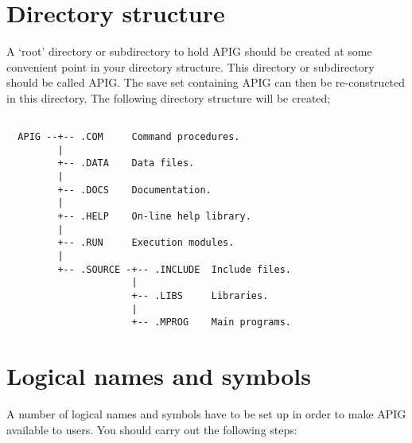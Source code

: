 \section{Directory structure}

A `root' directory or subdirectory to hold APIG should be created at 
some convenient point in your directory structure. This directory or
subdirectory should be called APIG. The save set containing APIG can 
then be re-constructed in this directory. The following directory
structure will be created;

\nopagebreak
\begin{verbatim}

  APIG --+-- .COM     Command procedures.
         |
         +-- .DATA    Data files.
         |
         +-- .DOCS    Documentation.
         |
         +-- .HELP    On-line help library.
         |
         +-- .RUN     Execution modules.
         |
         +-- .SOURCE -+-- .INCLUDE  Include files.
                      |
                      +-- .LIBS     Libraries.
                      |
                      +-- .MPROG    Main programs.

\end{verbatim}

\section{Logical names and symbols}

A number of logical names and symbols have to be set up in order to make
APIG available to users. You should carry out the following steps:

